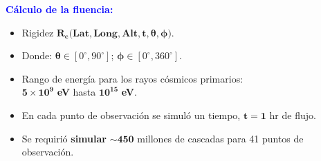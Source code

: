    \begin{frame}{} %
        \justifying %
        \vspace*{-0.4cm} %

        \begin{columns}
            \begin{column}{0.7\textwidth} %
                \textcolor{blue}{\textbf{Cálculo de la fluencia:}}
                \begin{itemize}
                    \item Rigidez $\mathbf{R_{c}(Lat, Long, Alt, t}, \bm{\theta}, \bm{\phi})$.
                    \item Donde: $\bm{\theta} \in [0^{\circ}, 90^{\circ}]$; $\bm{\phi} \in [0^{\circ}, 360^{\circ}]$.
                    \item Rango de energía para los rayos cósmicos primarios: \\$\mathbf{5 \times 10^{9}}$ \textbf{eV} hasta $\mathbf{10^{15}}$ \textbf{eV}. %
                    \item En cada punto de observación se simuló un tiempo, $\mathbf{t = 1}$ hr de flujo.
                    \item Se requirió \textbf{simular} $\mathbf{\sim 450}$  millones de cascadas para 41 puntos de observación.
                \end{itemize}
            \end{column}
            

\end{columns}
\end{frame}
